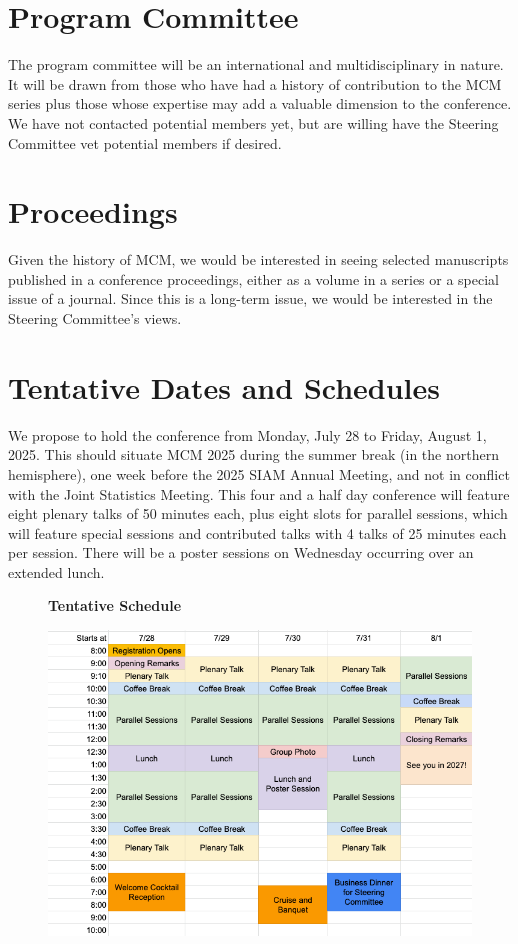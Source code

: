 \documentclass{article}
\newcommand{\yuhannote}[1]{{\color{purple}Yuhan: #1}}
\begin{document}
\section{Program Committee}
The program committee will be an international and multidisciplinary in nature.  It will be drawn from those who have had a history of contribution to the MCM series plus those whose expertise may add a valuable dimension to the conference.  We have not contacted potential members yet, but are willing have the Steering Committee vet potential members if desired.

\section{Proceedings}

Given the history of MCM, we would be interested in seeing selected manuscripts published in a conference proceedings, either as a volume in a series or a special issue of a journal.  Since this is a long-term issue, we would be interested in the Steering Committee's views.

\section{Tentative Dates and Schedules}

We propose to hold the conference from Monday, July 28 to Friday, August 1, 2025.  This should situate MCM 2025 during the summer break (in the northern hemisphere), one week before the 2025 SIAM Annual Meeting, and not in conflict with the Joint Statistics Meeting.  This four and a half day conference will feature eight plenary talks of 50 minutes each, plus eight slots for parallel sessions, which will feature special sessions and contributed talks with 4 talks of 25 minutes each per session.
There will be a poster sessions on Wednesday occurring over an extended lunch.

\begin{figure}[h]
    \centering
    \centerline{\textbf{Tentative Schedule}}
    \includegraphics[width =.95\textwidth]{MCMSchedule.png}
\end{figure}
\end{document}
